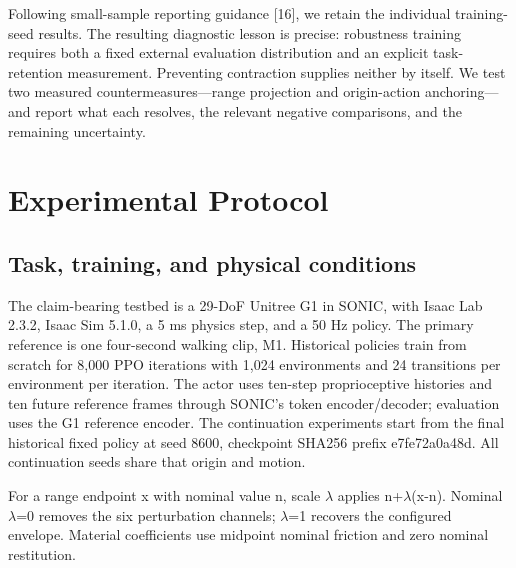 \documentclass[letterpaper,10pt,conference]{ieeeconf}
\begin{document}
Following small-sample reporting guidance [16], we retain the individual training-seed results. The resulting diagnostic lesson is precise: robustness training requires both a fixed external evaluation distribution and an explicit task-retention measurement. Preventing contraction supplies neither by itself. We test two measured countermeasures---range projection and origin-action anchoring---and report what each resolves, the relevant negative comparisons, and the remaining uncertainty.

\section{Experimental Protocol}

\subsection{Task, training, and physical conditions}

The claim-bearing testbed is a 29-DoF Unitree G1 in SONIC, with Isaac Lab 2.3.2, Isaac Sim 5.1.0, a 5 ms physics step, and a 50 Hz policy. The primary reference is one four-second walking clip, M1. Historical policies train from scratch for 8,000 PPO iterations with 1,024 environments and 24 transitions per environment per iteration. The actor uses ten-step proprioceptive histories and ten future reference frames through SONIC's token encoder/decoder; evaluation uses the G1 reference encoder. The continuation experiments start from the final historical fixed policy at seed 8600, checkpoint SHA256 prefix e7fe72a0a48d. All continuation seeds share that origin and motion.

For a range endpoint x with nominal value n, scale $\lambda$ applies n+$\lambda$(x-n). Nominal $\lambda$=0 removes the six perturbation channels; $\lambda$=1 recovers the configured envelope. Material coefficients use midpoint nominal friction and zero nominal restitution.
\end{document}
